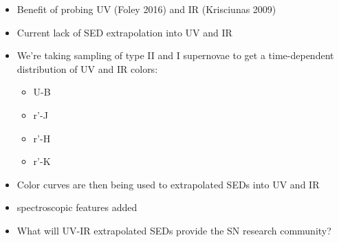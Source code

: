 \begin{itemize}
\item
Benefit of probing UV (Foley 2016) and IR (Krisciunas 2009)
\item
Current lack of SED extrapolation into UV and IR
\item
We're taking sampling of type II and I supernovae to get a time-dependent distribution of UV and IR colors:
\begin{itemize}
\item
U-B
\item
r'-J
\item
r'-H
\item
r'-K
\end{itemize}
\item
Color curves are then being used to extrapolated SEDs into UV and IR
\item
spectroscopic features added
\item
What will UV-IR extrapolated SEDs provide the SN research community?

\end{itemize}